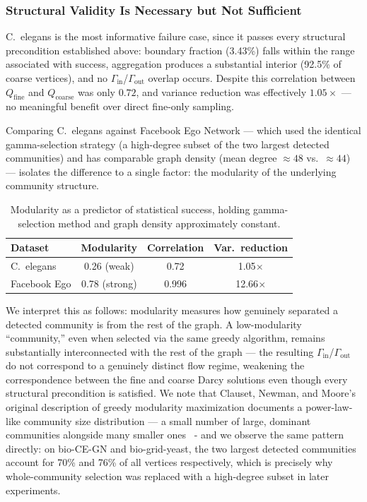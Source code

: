 \documentclass[a4paper,12pt]{amsart}
\numberwithin{equation}{section}
\begin{document}
\subsubsection{Structural Validity Is Necessary but Not Sufficient}

C.\ elegans is the most informative failure case, since it passes 
every structural precondition established above: boundary fraction 
(3.43\%) falls within the range associated with success, aggregation 
produces a substantial interior (92.5\% of coarse vertices), and no 
$\Gamma_{\text{in}}$/$\Gamma_{\text{out}}$ overlap occurs. Despite 
this correlation between $Q_{\text{fine}}$ and $Q_{\text{coarse}}$ was 
only $0.72$, and variance reduction was effectively $1.05\times$ — no 
meaningful benefit over direct fine-only sampling.

Comparing C.\ elegans against Facebook Ego Network — which used the 
identical gamma-selection strategy (a high-degree subset of the two 
largest detected communities) and has comparable graph density (mean 
degree $\approx 48$ vs.\ $\approx 44$) — isolates the difference to a 
single factor: the modularity of the underlying community structure.

\begin{table}[htbp]
\centering
\begin{tabular}{lccc}
\hline
Dataset & Modularity & Correlation & Var.\ reduction \\
\hline
C.\ elegans   & 0.26 (weak)   & 0.72  & 1.05$\times$ \\
Facebook Ego  & 0.78 (strong) & 0.996 & 12.66$\times$ \\
\hline
\end{tabular}
\caption{Modularity as a predictor of statistical success, holding gamma-selection method and graph density approximately constant.}
\label{tab:modularity}
\end{table}

We interpret this as follows: modularity measures how genuinely 
separated a detected community is from the rest of the graph. A 
low-modularity ``community,'' even when selected via the same greedy 
algorithm, remains substantially interconnected with the rest of the 
graph — the resulting $\Gamma_{\text{in}}$/$\Gamma_{\text{out}}$ do not 
correspond to a genuinely distinct flow regime, weakening the 
correspondence between the fine and coarse Darcy solutions even though 
every structural precondition is satisfied. We note that Clauset, 
Newman, and Moore's original description of greedy modularity 
maximization documents a power-law-like community size distribution — 
a small number of large, dominant communities alongside many smaller 
ones~\citep{clauset2004finding} - and we observe the same pattern 
directly: on bio-CE-GN and bio-grid-yeast, the two largest detected 
communities account for 70\% and 76\% of all vertices respectively, 
which is precisely why whole-community selection was replaced with a 
high-degree subset in later experiments.
\end{document}
